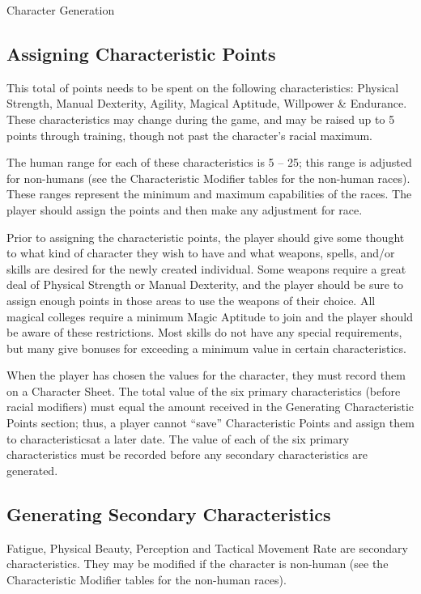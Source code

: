 \begin{Chapter}{Character Generation}

\subsection{Assigning Characteristic Points}

This total of points needs to be spent on the following
characteristics: Physical Strength, Manual Dexterity, Agility, Magical
Aptitude, Willpower \& Endurance.  These characteristics may change
during the game, and may be raised up to 5 points through training,
though not past the character’s racial maximum.

The human range for each of these characteristics is 5 -- 25; this
range is adjusted for non-humans (see the Characteristic Modifier
tables for the non-human races).  These ranges represent the minimum
and maximum capabilities of the races. The player should assign the
points and then make any adjustment for race.

Prior to assigning the characteristic points, the player should give
some thought to what kind of character they wish to have and what
weapons, spells, and/or skills are desired for the newly created
individual. Some weapons require a great deal of Physical Strength or
Manual Dexterity, and the player should be sure to assign enough
points in those areas to use the weapons of their choice.  All magical
colleges require a minimum Magic Aptitude to join and the player
should be aware of these restrictions.  Most skills do not have any
special requirements, but many give bonuses for exceeding a minimum
value in certain characteristics.

When the player has chosen the values for the character, they must
record them on a Character Sheet.  The total value of the six primary
characteristics (before racial modifiers) must equal the amount
received in the Generating Characteristic Points section; thus, a
player cannot “save” Characteristic Points and assign them to
characteristicsat a later date.  The value of each of the six primary
characteristics must be recorded before any secondary characteristics
are generated.

\subsection{Generating Secondary Characteristics}

Fatigue, Physical Beauty, Perception and Tactical Movement Rate are
secondary characteristics.  They may be modified if the character is
non-human (see the Characteristic Modifier tables for the non-human
races).


\end{Chapter}
